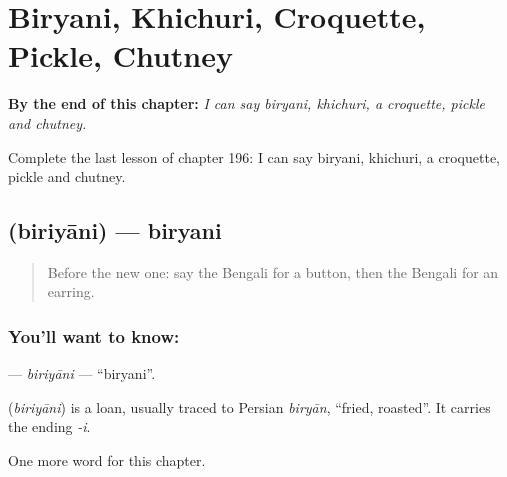 
\chapter{Biryani, Khichuri, Croquette, Pickle, Chutney}
\label{ch:bn-biryani-khichuri-croquette-pickle-chutney}

\begin{chapteropening}
\textbf{By the end of this chapter:} \emph{I can say biryani, khichuri, a croquette, pickle and chutney.}

Complete the last lesson of chapter 196: I can say biryani, khichuri, a croquette, pickle and chutney.
\end{chapteropening}

\section[\texorpdfstring{\bn{বিরিয়ানি} (biriyāni)}{বিরিয়ানি (biriyāni)}]{ (biriyāni) — biryani}

\label{lesson:BN-C196-biriyani}



\begin{quote}
Before the new one: say the Bengali for a button, then the Bengali for an earring.
\end{quote}

\subsection*{You'll want to know: }
\textbf{} — \emph{biriyāni} — \textquotedblleft{}biryani\textquotedblright{}.

\begin{cousinweb}
\textbf{} (\emph{biriyāni}) is a loan, usually traced to Persian \emph{biryān}, \textquotedblleft{}fried, roasted\textquotedblright{}. It carries the ending \emph{-i}.
\end{cousinweb}

\begin{grammarlens}[title={What you've built}]
One more word for this chapter.
\end{grammarlens}

